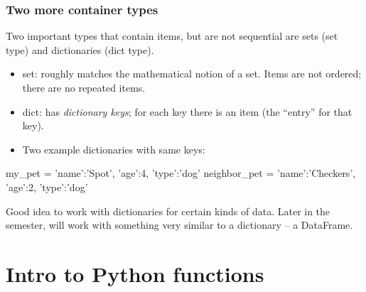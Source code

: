\documentclass{beamer}
\newenvironment{codeblock}
    {\hfill\begin{beamerboxesrounded}[lower=codecol, width=0.8\textwidth]
    \medskip

    }
    { 
    \end{beamerboxesrounded}\hfill
    }
\theoremstyle{example}
\begin{document}
\begin{frame}[fragile]
\frametitle{Two more container types}

Two important types that contain items, but are not sequential are sets ({\ttb set} type) and dictionaries ({\ttb dict} type).

\begin{itemize}
	\item {\ttb set}: roughly matches the mathematical notion of a set. Items are not ordered; there are no repeated items.
	\pause
	\item {\ttb dict}: has \emph{dictionary keys}; for each key there is an item (the ``entry'' for that key).
	\pause
	\item Two example dictionaries with same keys:
\end{itemize}

\begin{codeblock}

\begin{python}
my_pet = {'name':'Spot', 'age':4, 'type':'dog'}
neighbor_pet = {'name':'Checkers', 'age':2, 'type':'dog'}
\end{python}

\end{codeblock}

\vspace*{12pt}
\pause
Good idea to work with dictionaries for certain kinds of data. Later in the semester, will work with something very similar to a dictionary {--} a DataFrame.
\end{frame}

\section{Intro to Python functions}
\end{document}
